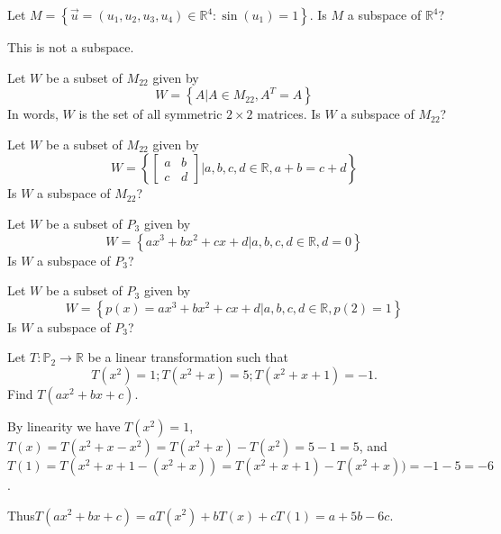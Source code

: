 \documentclass{ximera}
\begin{document}
\begin{problem}\label{prb:10.63} Let $M=\left\{ \vec{u}=\left( u_{1},u_{2},u_{3},u_{4}\right) \in
\mathbb{R}^{4}:\sin \left( u_{1}\right) =1\right\} .$ Is $M$ a subspace of $\mathbb{R}^4$?
\begin{hint}
This is not a subspace.
\end{hint}
\end{problem}

\begin{problem}\label{prb:10.64} Let $W$ be a subset of $M_{22}$ given by
\[
W = \left\{ A | A \in M_{22}, A^T = A \right\}
\]
In words, $W$ is the set of all symmetric $2 \times 2$ matrices. Is $W$ a subspace of $M_{22}$?
\end{problem}

\begin{problem}\label{prb:10.65} Let $W$ be a subset of $M_{22}$ given by
\[
W = \left\{ \left[ \begin{array}{rr}
a  & b \\
c & d
\end{array} \right] | a,b,c,d \in \mathbb{R}, a + b = c + d \right\}
\]
Is $W$ a subspace of $M_{22}$?
\end{problem}

\begin{problem}\label{prb:10.66} Let $W$ be a subset of $P_3$ given by
\[
W = \left\{
ax^3 + bx^2 + cx + d | a,b,c,d \in \mathbb{R}, d = 0 \right\}
\]
Is $W$ a subspace of $P_3$?
\end{problem}

\begin{problem}\label{prb:10.67} Let $W$ be a subset of $P_3$ given by
\[
W = \left\{
p(x) = ax^3 + bx^2 + cx + d | a,b,c,d \in \mathbb{R}, p(2) = 1 \right\}
\]
Is $W$ a subspace of $P_3$?
\end{problem}

\begin{problem}\label{prb:10.68}
Let $T:\mathbb{P}_2 \to \mathbb{R}$ be a linear transformation such that
\[ T(x^2)=1; T(x^2+x)=5; T(x^2+x+1)=-1.\]
Find $T(ax^2+bx+c)$.
\begin{hint}
By linearity we have
$T(x^2)=1$, $T(x) = T(x^2+x - x^2)= T(x^2+x) - T(x^2)= 5-1=5$, and
$T(1) = T(x^2+x+1 -(x^2+x))=T(x^2+x+1) -T(x^2+x))= -1-5=-6$.

Thus$T(ax^2+bx+c) = aT(x^2) + bT(x) + cT(1) = a+5b-6c$.
\end{hint}
\end{problem}
\end{document}
